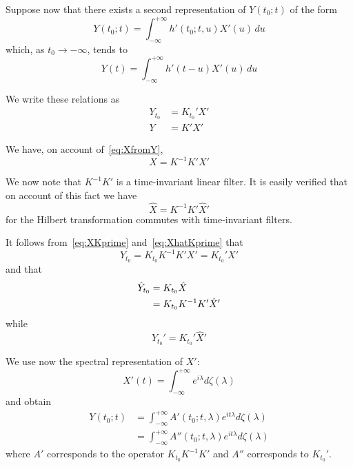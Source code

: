 \documentclass{article}
\begin{document}
Suppose now that there exists a second representation of $Y(t_0; t)$ of the form
\begin{equation}
Y(t_0; t) = \int_{-\infty}^{+\infty} h'(t_0; t, u) X'(u)\, du
\label{eq:Yt0tprime}
\end{equation}
which, as $t_0 \rightarrow -\infty$, tends to
\begin{equation}
Y(t) = \int_{-\infty}^{+\infty} h'(t-u) X'(u)\, du
\label{eq:Ytprime}
\end{equation}

We write these relations as
\begin{align}
Y_{t_0} &= K_{t_0}' X' \label{eq:Yt0Kprime} \\
Y &= K' X' \label{eq:YKprime}
\end{align}

We have, on account of~\eqref{eq:XfromY},
\begin{equation}
X = K^{-1} K' X'
\label{eq:XKprime}
\end{equation}

We now note that $K^{-1} K'$ is a time-invariant linear filter. It is easily verified that on account of this fact we have
\begin{equation}
\hat{X} = K^{-1} K' \hat{X}'
\label{eq:XhatKprime}
\end{equation}
for the Hilbert transformation commutes with time-invariant filters.

It follows from~\eqref{eq:XKprime} and~\eqref{eq:XhatKprime} that
\begin{equation}
Y_{t_0} = K_{t_0} K^{-1} K' X' = K_{t_0}' X'
\label{eq:Yt0KprimeX}
\end{equation}
and that
\begin{align}
\hat{Y}_{t_0} &= K_{t_0} \hat{X} \notag \\
&= K_{t_0} K^{-1} K' \hat{X}' \label{eq:YhatKprime}
\end{align}
while
\begin{equation}
\hat{Y}_{t_0}' = K_{t_0}' \hat{X}'
\label{eq:YhatprimeK}
\end{equation}

We use now the spectral representation of $X'$:
\begin{equation}
X'(t) = \int_{-\infty}^{+\infty} e^{i \lambda} d\zeta(\lambda)
\label{eq:XprimeSpectral}
\end{equation}
and obtain
\begin{align}
Y(t_0; t) &= \int_{-\infty}^{+\infty} A'(t_0; t, \lambda) e^{i t \lambda} d\zeta(\lambda) \label{eq:Yt0A} \\
&= \int_{-\infty}^{+\infty} A''(t_0; t, \lambda) e^{i t \lambda} d\zeta(\lambda) \label{eq:Yt0Aprime}
\end{align}
where $A'$ corresponds to the operator $K_{t_0} K^{-1} K'$ and $A''$ corresponds to $K_{t_0}'$.
\end{document}
